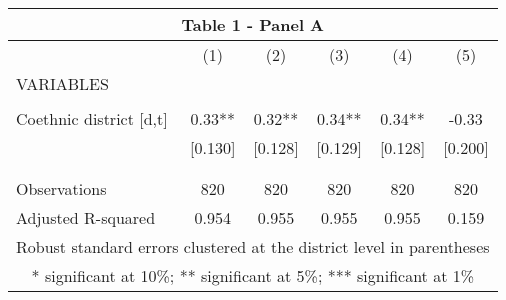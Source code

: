 \begin{tabular}{lccccc}
\multicolumn{6}{c}{Table 1 - Panel A} \\ \hline
 & (1) & (2) & (3) & (4) & (5) \\
VARIABLES &  &  &  &  &  \\ \hline
 &  &  &  &  &  \\
Coethnic district [d,t] & 0.33** & 0.32** & 0.34** & 0.34** & -0.33 \\
 & [0.130] & [0.128] & [0.129] & [0.128] & [0.200] \\
 &  &  &  &  &  \\
 &  &  &  &  &  \\
Observations & 820 & 820 & 820 & 820 & 820 \\
 Adjusted R-squared & 0.954 & 0.955 & 0.955 & 0.955 & 0.159 \\ \hline
\multicolumn{6}{c}{ Robust standard errors clustered at the district level in parentheses} \\
\multicolumn{6}{c}{ * significant at 10\%; ** significant at 5\%; *** significant at 1\%} \\
\end{tabular}

